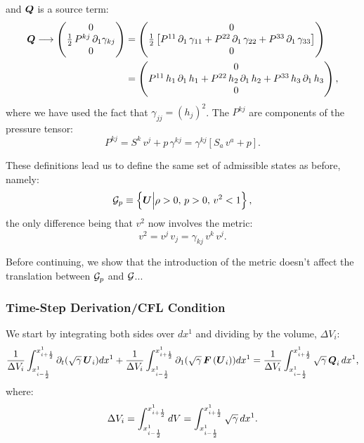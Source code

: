 \documentclass[10pt,preprint]{aastex}
\begin{document}
and $\bQ$ is a source term:
\begin{align}
    \bQ\longrightarrow\begin{pmatrix}0\\\f{1}{2}\,P^{kj}\,\p_{1}\gamma_{kj}\\0\end{pmatrix}&=\begin{pmatrix}0\\ \f{1}{2}\left[P^{11}\,\p_{1}\,\gamma_{11}+P^{22}\,\p_{1}\,\gamma_{22}+P^{33}\,\p_{1}\,\gamma_{33}\right] \\0\end{pmatrix}\\
    &=\begin{pmatrix}0\\ P^{11}\,h_{1}\,\pd{\,h_{1}}{1}+P^{22}\,h_{2}\,\pd{\,h_{2}}{1}+P^{33}\,h_{3}\,\pd{\,h_{3}}{1} \\0\end{pmatrix},
\end{align}
where we have used the fact that $\gamma_{jj}=\left(h_{j}\right)^{2}$. The $P^{kj}$ are components of the pressure tensor:
\begin{equation}
    P^{kj}=S^{k}\,v^{j}+p\,\gamma^{kj}=\gamma^{kj}\left[S_{a}\,v^{a}+p\right].
\end{equation}

These definitions lead us to define the same set of admissible states as before, namely:
\begin{equation}
    \cG_{p}\equiv\left\{\bU\Big|\rho>0,\,p>0,\,v^{2}<1\right\},
\end{equation}
the only difference being that $v^{2}$ now involves the metric:
\begin{equation}
    v^{2}=v^{j}\,v_{j}=\gamma_{kj}\,v^{k}\,v^{j}.
\end{equation}

Before continuing, we show that the introduction of the metric doesn't affect the translation between $\cG_{p}$ and $\cG$...

\subsubsection{Time-Step Derivation/CFL Condition}
We start by integrating both sides over $dx^{1}$ and dividing by the volume, $\Delta V_{i}$:
\begin{equation}
    \f{1}{\Delta V_{i}}\int_{x^{1}_{\imh}}^{x^{1}_{\iph}}\pd{\left(\sqrtgm\,\bU_{i}\right)}{t}dx^{1}+\f{1}{\Delta V_{i}}\int_{x^{1}_{\imh}}^{x^{1}_{\iph}}\pd{\left(\sqrtgm\,\bF\left(\bU_{i}\right)\right)}{1}dx^{1}=\f{1}{\Delta V_{i}}\int_{x^{1}_{\imh}}^{x^{1}_{\iph}}\sqrtgm\,\bQ_{i}\,dx^{1},
\end{equation}
where:
\begin{equation}
    \Delta V_{i}=\int_{x^{1}_{\imh}}^{x^{1}_{\iph}}dV=\int_{x^{1}_{\imh}}^{x^{1}_{\iph}}\sqrtgm\,dx^{1}.
\end{equation}
\end{document}
